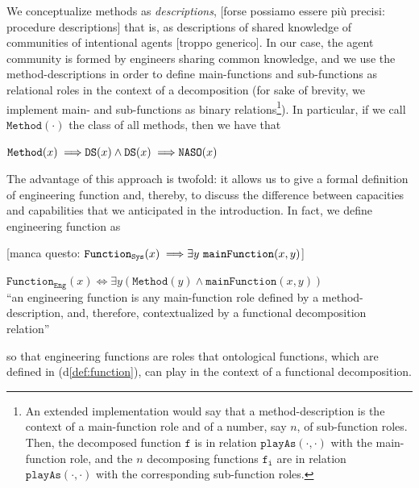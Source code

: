 \documentclass[sw]{iosart2x}
\newcommand{\bflist}{\begin{list}{}{\setlength{\topsep}{2mm}\setlength{\partopsep}{0mm}\setlength{\parsep}{0mm}\setlength{\leftmargin}{9mm}\setlength{\labelwidth}{8mm}}}
\newcommand{\eflist}{\end{list}}
\newcommand{\AxLabel}{\textrm{a}}
\newcommand{\DefLabel}{\textrm{d}}
\newcounter{cntax}
\newcommand{\myax}[1]{\refstepcounter{cntax}\begin{small}{\bf \AxLabel\thecntax\label{ax:#1}}\end{small}}
\newcounter{cntdef}
\newcommand{\mydf}[1]{\refstepcounter{cntdef}\begin{small}{\bf \DefLabel\thecntdef\label{def:#1}}\end{small}}
\newcommand{\refdf}[1]{({\DefLabel}\ref{#1})}
\newcommand{\generalStyle}[1]{\texttt{#1}}
\newcommand{\biRel}[3]{\generalStyle{#1}(#2,#3)}
\newcommand{\uniRel}[2]{\generalStyle{#1}(#2)}
\newcommand{\uniRelPar}[3]{\generalStyle{#1}_{\generalStyle{#3}}(#2)}
\newcommand{\cst}[1]{\ensuremath{\mathtt{#1}}}
\newcommand{\myiff}{\Longleftrightarrow}
\newcommand{\myfi}{\hspace{0.9mm} \Longrightarrow}
\newcommand{\DOLCEDescription}[1]{\uniRel{{DS}}{#1}}
\newcommand{\DOLCENASO}[1]{\uniRel{{NASO}}{#1}}
\newcommand{\Method}[1]{\uniRel{Method}{#1}}
\newcommand{\FunctionSys}[1]{\uniRelPar{Function}{#1}{Sys}}
\newcommand{\FunctionEng}[1]{\uniRelPar{Function}{#1}{Eng}}
\newcommand{\mainFunction}[2]{\biRel{mainFunction}{#1}{#2}}
\newcommand{\playAs}[2]{\biRel{playAs}{#1}{#2}}
\newcommand{\firstTimeKeyWord}[1]{\textit{#1}}
\newcommand{\quotes}[1]{`#1'}
\newcommand{\TODO}[1]{{\color{red} #1}}
\newcommand{\myComment}[1]{}
\begin{document}
{%
We conceptualize methods as \firstTimeKeyWord{descriptions},\TODO{[forse possiamo essere più precisi: procedure descriptions]} that is, as descriptions of shared knowledge of communities of intentional agents\TODO{[troppo generico]}.
In our case, the agent community is formed by engineers sharing common knowledge, %
and we use the method-descriptions in order to define main-functions and sub-functions as relational roles in the context of a decomposition (for sake of brevity, we implement main- and sub-functions as binary relations\footnote{An extended implementation would say that a method-description is the context of a main-function role and of a number, say $n$, of sub-function roles. Then, the decomposed function $\cst{f}$ is in relation $\playAs{\cdot}{\cdot}$ with the main-function role, and the $n$ decomposing functions $\cst{f_i}$ are in relation $\playAs{\cdot}{\cdot}$ with the corresponding sub-function roles.}).
In particular, if we call $\Method{\cdot}$ the class \myComment{subsuming all method-types} of all methods, then we have that
\bflist
  \item[\myax{methodSubs}] $ \Method{x} \myfi \DOLCEDescription{x} \land \DOLCEDescription{x}  \myfi \DOLCENASO{x}$
\eflist

The advantage of this approach is twofold: it allows us to give a formal definition of engineering function and, thereby, to discuss the difference between capacities and capabilities that we anticipated in the introduction. 
In fact, we define engineering function as

\TODO{[manca questo: $\FunctionSys{x} \myfi \exists y~ \mainFunction{x}{y}$]} 

\bflist
  \item[\mydf{engfunction}]  $ \FunctionEng{x} \myiff \exists y (\Method{y} \land \mainFunction{x}{y}) $ \\
  \mbox{} \hfill ``an engineering function is any main-function role defined by a method-description, and, therefore, contextualized by a functional decomposition relation''
\eflist
so that engineering functions are roles that ontological functions, which are defined in \refdf{def:function}, can play in the context of a functional decomposition.

}
\end{document}
